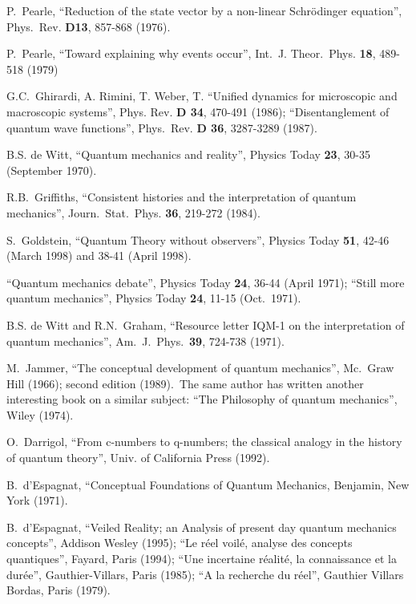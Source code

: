 \documentclass[12pt,onecolumn]{article}%
\begin{document}
\begin{thebibliography}{999}
P.\ Pearle, ``Reduction of the state vector by a non-linear
Schr\"{o}dinger equation'', Phys.\ Rev. \textbf{D13}, 857-868 (1976).

P.\ Pearle, ``Toward explaining why events occur'',
Int.\ J. Theor.\ Phys. \textbf{18}, 489-518 (1979)

G.C.\ Ghirardi, A. Rimini, T. Weber, T. ``Unified dynamics
for microscopic and macroscopic systems'', Phys. Rev. \textbf{D 34}, 470-491
(1986); ``Disentanglement of quantum wave functions'', Phys.\ Rev. \textbf{D
36}, 3287-3289 (1987).

B.S. de Witt, ``Quantum mechanics and reality'', Physics
Today \textbf{23}, 30-35 (September 1970).

R.B.\ Griffiths, ``Consistent histories and the
interpretation of quantum mechanics'', Journ.\ Stat.\ Phys. \textbf{36},
219-272 (1984).

S.\ Goldstein, ``Quantum Theory without observers'',
Physics Today \textbf{51}, 42-46 (March 1998) and 38-41 (April 1998).

``Quantum mechanics debate'', Physics Today \textbf{24},
36-44 (April 1971); ``Still more quantum mechanics'', Physics Today
\textbf{24}, 11-15 (Oct.\ 1971).

B.S. de Witt and R.N.\ Graham, ``Resource letter IQM-1 on the
interpretation of quantum mechanics'', Am.\ J.\ Phys.\ \textbf{39}, 724-738 (1971).

M.\ Jammer, ``The conceptual development of quantum
mechanics'', Mc.\ Graw Hill (1966); second edition (1989).\ The same author
has written another interesting book on a similar subject: ``The Philosophy of
quantum mechanics'', Wiley (1974).

O.\ Darrigol, ``From c-numbers to q-numbers; the
classical analogy in the history of quantum theory'', Univ. of California
Press (1992).

B.\ d'Espagnat, ``Conceptual Foundations of Quantum
Mechanics, Benjamin, New York (1971).

B.\ d'Espagnat, ``Veiled Reality; an Analysis of
present day quantum mechanics concepts'', Addison Wesley (1995); ``Le r\'{e}el
voil\'{e}, analyse des concepts quantiques'', Fayard, Paris (1994); ``Une
incertaine r\'{e}alit\'{e}, la connaissance et la dur\'{e}e'',
Gauthier-Villars, Paris (1985); ``A la recherche du r\'{e}el'', Gauthier
Villars Bordas, Paris (1979).


\end{thebibliography}
\end{document}
